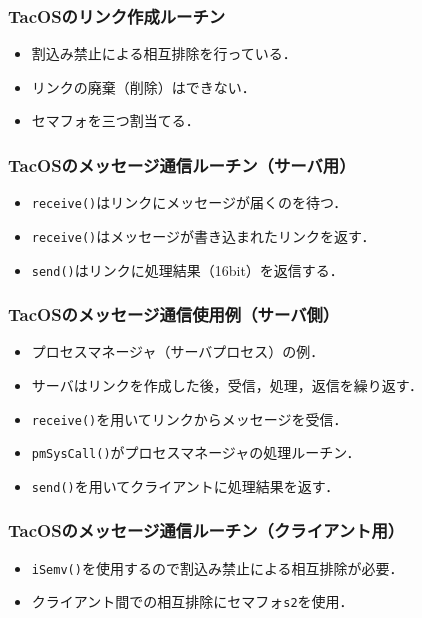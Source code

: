 \documentclass{beamer}                   %
\begin{document}
\begin{frame}
  \frametitle{TacOSのリンク作成ルーチン}
  \begin{itemize}
  \item 割込み禁止による相互排除を行っている．
  \item リンクの廃棄（削除）はできない．
  \item セマフォを三つ割当てる．
  \end{itemize}
\end{frame}

\begin{frame}
  \frametitle{TacOSのメッセージ通信ルーチン（サーバ用）}
  \begin{itemize}
  \item {\tt receive()}はリンクにメッセージが届くのを待つ．
  \item {\tt receive()}はメッセージが書き込まれたリンクを返す．
  \item {\tt send()}はリンクに処理結果（16bit）を返信する．
  \end{itemize}
\end{frame}

\begin{frame}
  \frametitle{TacOSのメッセージ通信使用例（サーバ側）}
  \begin{itemize}
  \item プロセスマネージャ（サーバプロセス）の例．
  \item サーバはリンクを作成した後，受信，処理，返信を繰り返す．
  \item {\tt receive()}を用いてリンクからメッセージを受信．
  \item {\tt pmSysCall()}がプロセスマネージャの処理ルーチン．
  \item {\tt send()}を用いてクライアントに処理結果を返す．
  \end{itemize}
\end{frame}

\begin{frame}
  \frametitle{TacOSのメッセージ通信ルーチン（クライアント用）}
  \begin{itemize}
  \item {\tt iSemv()}を使用するので割込み禁止による相互排除が必要．
  \item クライアント間での相互排除にセマフォ{\tt s2}を使用．
  \end{itemize}
\end{frame}
\end{document}
